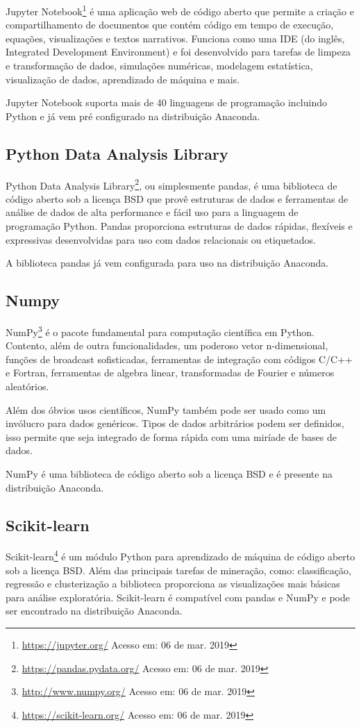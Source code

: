 Jupyter Notebook\footnote{\url{https://jupyter.org/} Acesso em: 06 de mar. 2019}
é uma aplicação web de código aberto que permite a criação e compartilhamento de
documentos que contém código em tempo de execução, equações, visualizações e
textos narrativos. Funciona como uma IDE (do inglês, Integrated Development
Environment) e foi desenvolvido para tarefas de limpeza e transformação de
dados, simulações numéricas, modelagem estatística, visualização de dados,
aprendizado de máquina e mais.

Jupyter Notebook suporta mais de 40 linguagens de programação incluindo Python e
já vem pré configurado na distribuição Anaconda.

\subsection{Python Data Analysis Library}

Python Data Analysis Library\footnote{\url{https://pandas.pydata.org/} Acesso
em: 06 de mar. 2019}, ou simplesmente pandas, é uma biblioteca de código aberto
sob a licença BSD que provê estruturas de dados e ferramentas de análise de
dados de alta performance e fácil uso para a linguagem de programação Python.
Pandas proporciona estruturas de dados rápidas, flexíveis e expressivas
desenvolvidas para uso com dados relacionais ou etiquetados.

A biblioteca pandas já vem configurada para uso na distribuição Anaconda.

\subsection{Numpy}

NumPy\footnote{\url{http://www.numpy.org/} Acesso em: 06 de mar. 2019} é o
pacote fundamental para computação científica em Python. Contento, além de outra
funcionalidades, um poderoso vetor n-dimensional, funções de broadcast
sofisticadas, ferramentas de integração com códigos C/C++ e Fortran, ferramentas
de algebra linear, transformadas de Fourier e números aleatórios.

Além dos óbvios usos científicos, NumPy também pode ser usado como um invólucro
para dados genéricos. Tipos de dados arbitrários podem ser definidos, isso
permite que  seja integrado de forma rápida com uma miríade de bases de dados.

NumPy é uma biblioteca de código aberto sob a licença BSD e é presente na
distribuição Anaconda.

\subsection{Scikit-learn}

Scikit-learn\footnote{\url{https://scikit-learn.org/} Acesso em: 06 de mar.
2019} é um módulo Python para aprendizado de máquina de código aberto sob a
licença BSD. Além das principais tarefas de mineração, como: classificação,
regressão e clusterização a biblioteca proporciona as visualizações mais básicas
para análise exploratória. Scikit-learn é compatível com pandas e NumPy e pode
ser encontrado na distribuição Anaconda.
